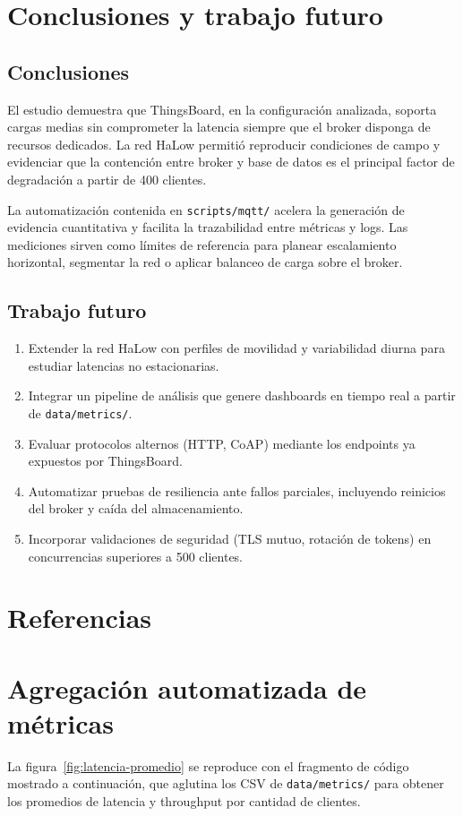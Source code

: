 ﻿\documentclass[conference]{IEEEtran}
\begin{document}
\section{Conclusiones y trabajo futuro}
\subsection{Conclusiones}
El estudio demuestra que ThingsBoard, en la configuraci\'on analizada, soporta cargas medias sin comprometer la latencia siempre que el broker disponga de recursos dedicados. La red HaLow permiti\'o reproducir condiciones de campo y evidenciar que la contenci\'on entre broker y base de datos es el principal factor de degradaci\'on a partir de \num{400} clientes.

La automatizaci\'on contenida en \texttt{scripts/mqtt/} acelera la generaci\'on de evidencia cuantitativa y facilita la trazabilidad entre m\'etricas y logs. Las mediciones sirven como l\'imites de referencia para planear escalamiento horizontal, segmentar la red o aplicar balanceo de carga sobre el broker.

\subsection{Trabajo futuro}
\begin{enumerate}
  \item Extender la red HaLow con perfiles de movilidad y variabilidad diurna para estudiar latencias no estacionarias.
  \item Integrar un pipeline de an\'alisis que genere dashboards en tiempo real a partir de \texttt{data/metrics/}.
  \item Evaluar protocolos alternos (HTTP, CoAP) mediante los endpoints ya expuestos por ThingsBoard.
  \item Automatizar pruebas de resiliencia ante fallos parciales, incluyendo reinicios del broker y ca\'ida del almacenamiento.
  \item Incorporar validaciones de seguridad (TLS mutuo, rotaci\'on de tokens) en concurrencias superiores a \num{500} clientes.
\end{enumerate}

\section{Referencias}
\printbibliography[heading=none]

\appendices
\section{Agregaci\'on automatizada de m\'etricas}
\label{app:agregacion}
La figura~\ref{fig:latencia-promedio} se reproduce con el fragmento de c\'odigo mostrado a continuaci\'on, que aglutina los CSV de \texttt{data/metrics/} para obtener los promedios de latencia y throughput por cantidad de clientes.
\end{document}

